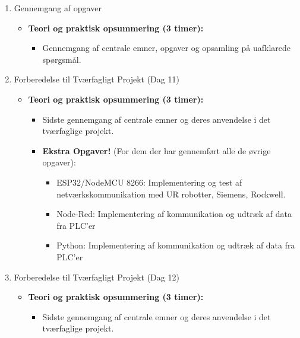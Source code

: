 \documentclass[12pt,a4paper]{article}
\begin{document}
\begin{enumerate}[leftmargin=*, label=\textbf{Dag \arabic* (3 timer)}]
		\item Gennemgang af opgaver
		\begin{itemize}
			\item \textbf{Teori og praktisk opsummering (3 timer):}
			\begin{itemize}
				\item Gennemgang af centrale emner, opgaver og opsamling på uafklarede spørgsmål.
			\end{itemize}
		\end{itemize}

		\item Forberedelse til Tværfagligt Projekt (Dag 11)
		\begin{itemize}
			\item \textbf{Teori og praktisk opsummering (3 timer):}
			\begin{itemize}
				\item Sidste gennemgang af centrale emner og deres anvendelse i det tværfaglige projekt.
				\item \textbf{Ekstra Opgaver!} (For dem der har gennemført alle de øvrige opgaver):
				\begin{itemize}
					\item ESP32/NodeMCU 8266: Implementering og test af netværkskommunikation med UR robotter, Siemens, Rockwell.
					\item Node-Red: Implementering af kommunikation og udtræk af data fra PLC'er
					\item Python: Implementering af kommunikation og udtræk af data fra PLC'er
				\end{itemize}
			\end{itemize}
		\end{itemize}
		
		\item Forberedelse til Tværfagligt Projekt (Dag 12)
		\begin{itemize}
			\item \textbf{Teori og praktisk opsummering (3 timer):}
			\begin{itemize}
				\item Sidste gennemgang af centrale emner og deres anvendelse i det tværfaglige projekt.				
			\end{itemize}
		\end{itemize}
	\end{enumerate}
\end{document}
